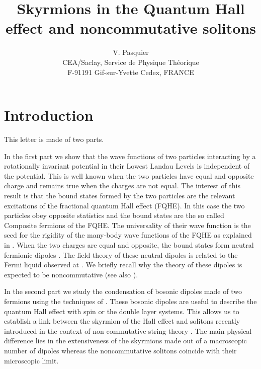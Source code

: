 \documentclass[a4paper,11pt]{article}
\title{ Skyrmions in the Quantum Hall effect and noncommutative solitons}
\author{V. Pasquier\\
CEA/Saclay, Service de Physique Th\'eorique\\
F-91191 Gif-sur-Yvette Cedex, FRANCE
}
\begin{document}
\maketitle
{}



\section{Introduction}
\smallskip

This letter is made of two parts.

In the first part we show that the wave functions of two particles interacting
by a rotationally invariant potential in their Lowest Landau Levels is 
independent of the potential. This is well known \cite{LER}  when the two particles 
have equal and opposite charge and remains true when the charges are not equal.
The interest of this result is that the bound states formed by the two
particles are the relevant excitations of the fractional quantum Hall effect (FQHE).
In this case the two particles obey opposite
statistics and the bound states are the so called Composite fermions of the FQHE.
The universality of their
wave function is the seed for the rigidity of the many-body wave functions
of the FQHE \cite{JAIN} as explained in \cite{PAHA}. 
When the two charges are equal and opposite, the 
bound states form neutral
fermionic dipoles \cite{PAHA,READ}.
The field theory of these neutral dipoles is  related to the 
Fermi liquid observed at \coordHE{} \cite{HALP}.
We briefly recall why the theory of these dipoles is expected to be noncommutative
(see also \cite{SUS,SUS1}).

In the second part
we study the condensation of bosonic dipoles made of two fermions
using the
techniques of \cite{PAHA}. 
These bosonic dipoles are useful to describe the quantum Hall effect
with spin
or the double layer systems.
This allows us to establish a link
between the skyrmion of the Hall effect 
\cite{REZ,SON}  and solitons
recently introduced in the context of non commutative string theory
\cite{GOP,MUK,HAR,WIT}.
The main physical difference 
lies in the extensiveness of the skyrmions
made out of a macroscopic number of dipoles whereas the noncommutative solitons
\cite{WIT}
coincide with their microscopic limit.
\end{document}
